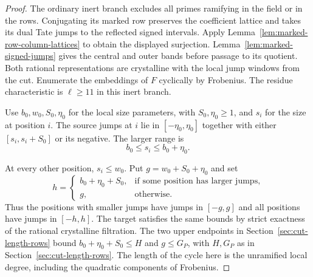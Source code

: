 \begin{proof}
The ordinary inert branch excludes all primes ramifying in the field or in the rows. Conjugating its marked row preserves the coefficient lattice and takes its dual Tate jumps to the reflected signed intervals. Apply Lemma~\ref{lem:marked-row-column-lattices} to obtain the displayed surjection. Lemma~\ref{lem:marked-signed-jumps} gives the central and outer bands before passage to its quotient. Both rational representations are crystalline with the
local jump windows from the cut. Enumerate the embeddings of \(F\)
cyclically by Frobenius. The residue characteristic is \(\ell\ge11\)
in this inert branch.

Use \(b_0,w_0,S_0,\eta_0\) for the local size parameters, with
\(S_0,\eta_0\ge1\), and \(s_i\) for the size at position \(i\).
The source jumps at \(i\) lie in \([-\eta_0,\eta_0]\) together
with either \([s_i,s_i+S_0]\) or its negative. The larger range is
\[
 b_0\le s_i\le b_0+\eta_0.
\]

At every other position,
\(s_i\le w_0\). Put \(g=w_0+S_0+\eta_0\) and set
\[
 h=\begin{cases}b_0+\eta_0+S_0,&\text{if some position has larger jumps},\\
                  g,&\text{otherwise}.\end{cases}
\]
Thus the positions with smaller jumps have jumps in \([-g,g]\) and all positions
have jumps in \([-h,h]\). The target satisfies the same bounds by
strict exactness of the rational crystalline filtration.
The two upper endpoints in Section~\ref{sec:cut-length-rows} bound \(b_0+\eta_0+S_0\le H\)
and \(g\le G_P\), with \(H,G_P\) as in Section~\ref{sec:cut-length-rows}.
The length of the cycle here is the unramified local degree, including
the quadratic components of Frobenius.
\end{proof}

